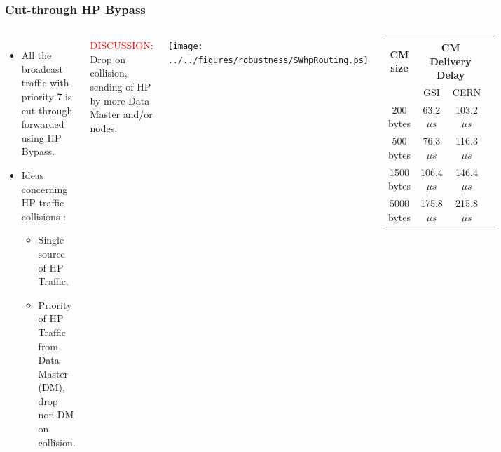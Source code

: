 \documentclass[]{beamer}
\begin{document}
\begin{frame}
  \frametitle{Cut-through HP Bypass}
 
  \begin{columns}[c]
  \column{2.8in}  %
  \begin{itemize}
  \item All the broadcast traffic with priority 7 is cut-through forwarded
        using  HP Bypass.
  \item Ideas concerning HP traffic collisions :
  \begin{itemize}
    \item Single source of HP Traffic.
    \item Priority of HP Traffic from Data Master (DM), drop non-DM on
          collision.
  \end{itemize}
  \end{itemize}
\centering
\textcolor{red}{DISCUSSION:} \\
Drop on collision, sending of HP by more Data Master and/or nodes.

  \column{2.3in}
  \centering
  \texttt{[image: ../../figures/robustness/SWhpRouting.ps]}
  {\tiny
  \begin{table}[ht]
	  \begin{tabular}{| c | c | c | c |}          \hline
  \textbf{CM size}& \multicolumn{2}{|c|}{\textbf{CM Delivery Delay}}\\
		&    GSI           & CERN          \\ \hline
  200 bytes      &  63.2$\mu s$     & 103.2$\mu s$    \\ \hline
  500 bytes      &  76.3$\mu s$     & 116.3$\mu s$    \\ \hline
  1500 bytes     & 106.4$\mu s$     & 146.4$\mu s$    \\ \hline
  5000 bytes     & 175.8$\mu s$     & 215.8$\mu s$    \\ \hline
  \end{tabular}
  \label{tab:CMspDelay}
  \end{table}
  }

  \end{columns}

\end{frame}


\end{document}
